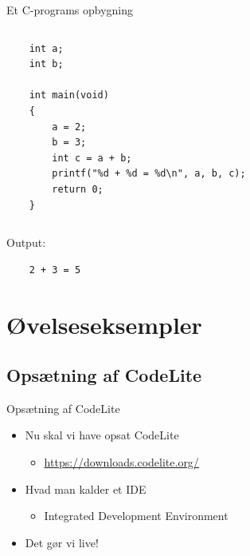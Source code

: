 \documentclass{beamer}
\begin{document}
\begin{frame}[fragile]{Et C-programs opbygning}
\begin{columns}
\begin{column}{0.4\textwidth}
\begin{lstlisting}
	int a;
	int b;	
	
	int main(void)
	{
		a = 2;
		b = 3;
		int c = a + b;
		printf("%d + %d = %d\n", a, b, c);
		return 0;
	}
	\end{lstlisting}
	\end{column}
	
	\end{columns}
	\begin{center}
	Output:
	\lstset{language=bash, numbers=none}
	\begin{lstlisting}
	2 + 3 = 5 
	\end{lstlisting}
	\end{center}
\end{frame}

\section{Øvelseseksempler}
\subsection{Opsætning af CodeLite}
\begin{frame}{Opsætning af CodeLite}
	\begin{itemize}
	\item{Nu skal vi have opsat CodeLite}
	\begin{itemize}
		\item{\url{https://downloads.codelite.org/}}
		\end{itemize}
	\item{Hvad man kalder et IDE}
		\begin{itemize}
		\item{Integrated Development Environment}
		\end{itemize}
	\item{Det gør vi live!}
	\end{itemize}
\end{frame}

\end{document}
